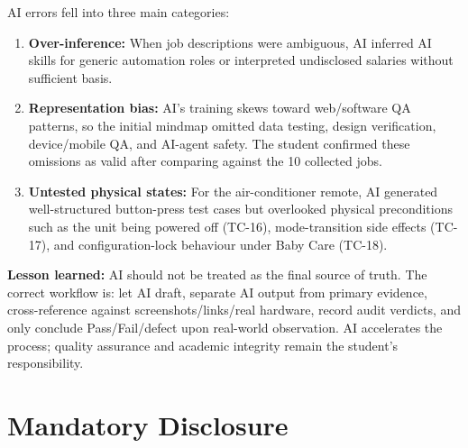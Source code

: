 \documentclass[12pt, a4paper]{article}
\begin{document}
AI errors fell into three main categories:

\begin{enumerate}[leftmargin=*, label=\arabic*.]
  \item \textbf{Over-inference:} When job descriptions were ambiguous, AI inferred AI skills for generic automation roles or interpreted undisclosed salaries without sufficient basis.
  \item \textbf{Representation bias:} AI's training skews toward web/software QA patterns, so the initial mindmap omitted data testing, design verification, device/mobile QA, and AI-agent safety. The student confirmed these omissions as valid after comparing against the 10 collected jobs.
  \item \textbf{Untested physical states:} For the air-conditioner remote, AI generated well-structured button-press test cases but overlooked physical preconditions such as the unit being powered off (TC-16), mode-transition side effects (TC-17), and configuration-lock behaviour under Baby Care (TC-18).
\end{enumerate}

\textbf{Lesson learned:} AI should not be treated as the final source of truth. The correct workflow is: let AI draft, separate AI output from primary evidence, cross-reference against screenshots/links/real hardware, record audit verdicts, and only conclude Pass/Fail/defect upon real-world observation. AI accelerates the process; quality assurance and academic integrity remain the student's responsibility.

\section{Mandatory Disclosure}
\end{document}
